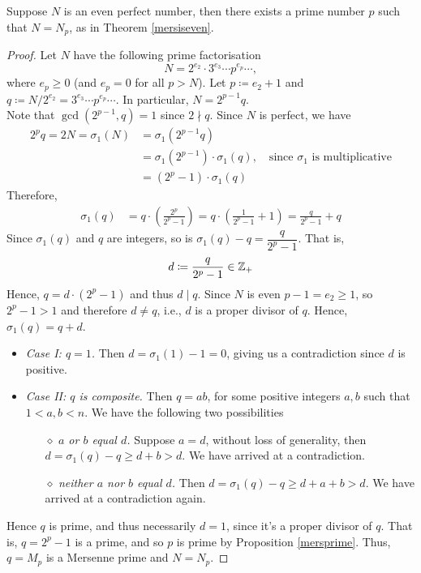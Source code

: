 \begin{theorem}[Euler, 1849]
Suppose $N$ is an even perfect number, then there exists a prime number $p$ such that $N = N_p$, as in Theorem \ref{mersiseven}.
\end{theorem}
\begin{proof}
Let $N$ have the following prime factorisation 
\[N = 2^{e_2}\cdot 3^{e_3}\cdots p^{e_p}\cdots,\]
where $e_p \geq 0$ (and $e_p = 0$ for all $p>N$). Let $p \coloneqq e_2 + 1$ and $q \coloneqq N/2^{e_2} = 3^{e_3}\cdots p^{e_p}\cdots$. In particular, $N = 2^{p-1}q$.\\[0.5em]
Note that $\gcd(2^{p-1},q) = 1$ since $2\nmid q$. Since $N$ is perfect, we have
\begin{align*}
2^pq = 2N = \sigma_1(N) &= \sigma_1(2^{p-1}q)\\[0.5em]
&= \sigma_1(2^{p-1})\cdot\sigma_1(q),\quad \text{since $\sigma_1$ is multiplicative}\\[0.5em]
&= (2^p - 1)\cdot\sigma_1(q)
\end{align*}
Therefore, 
\begin{align*}
\sigma_1(q) &= q\cdot\left(\frac{2^p}{2^p - 1}\right) = q\cdot\left(\frac{1}{2^p - 1} + 1\right) = \frac{q}{2^p - 1} + q
\end{align*}
Since $\sigma_1(q)$ and $q$ are integers, so is $\sigma_1(q) - q = \dfrac{q}{2^p - 1}$.  That is,
\[d \coloneqq \dfrac{q}{2^p - 1} \in \mathbb Z_+\]
Hence, $q = d\cdot(2^p - 1)$ and thus $d\mid q$. Since $N$ is even $p - 1 = e_2 \geq 1$, so $2^p - 1 > 1$ and therefore $d \neq q$, i.e., $d$ is a proper divisor of $q$. Hence, $\sigma_1(q) = q + d$.
\begin{itemize}
\item \emph{Case I: $q = 1$.} Then $d = \sigma_1(1) - 1 = 0$, giving us a contradiction since $d$ is positive.
\item \emph{Case II: $q$ is composite.} Then $q = ab$, for some positive integers $a,b$ such that $1<a,b<n$. We have the following two possibilities
\begin{itemize}
\item[$\diamond$] \emph{$a$ or $b$ equal $d$.} Suppose $a = d$, without loss of generality, then $d = \sigma_1(q) - q \geq d + b > d$. We have arrived at a contradiction.
\item[$\diamond$] \emph{neither $a$ nor $b$ equal $d$.} Then $d = \sigma_1(q) - q \geq d + a + b > d$. We have arrived at a contradiction again.
\end{itemize}
\end{itemize}
Hence $q$ is prime, and thus necessarily $d = 1$, since it's a proper divisor of $q$. That is, $q = 2^p - 1$ is a prime, and so $p$ is prime by Proposition \ref{mersprime}. Thus, $q = M_p$ is a Mersenne prime and $N = N_p$.
\end{proof}

